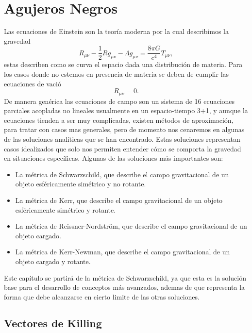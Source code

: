 \chapter{Agujeros Negros}

Las ecuaciones de Einstein son la teoría moderna por la cual describimos la gravedad 
\begin{equation}
    R_{\mu \nu}-\frac{1}{2} R g_{\mu \nu}-\Lambda g_{\mu \nu} = \frac{8 \pi G}{c^4} T_{\mu \nu},
    \label{EinsteinFieldEquations}
\end{equation}
estas describen como se curva el espacio dada una distribución de materia. Para los casos donde no estemos en presencia de materia se deben de cumplir las ecuaciones de vació
\begin{equation}
    R_{\mu \nu} = 0.
    \label{vacuumFieldEquations}
\end{equation}
De manera genérica las ecuaciones de campo son un sistema de 16 ecuaciones parciales acopladas no lineales usualmente en un espacio-tiempo 3+1,  y aunque la ecuaciones tienden a ser muy complicadas, existen métodos de aproximación, para tratar con casos mas generales, pero de momento nos cenaremos en algunas de las  soluciones analíticas que se han encontrado. Estas soluciones representan casos idealizados que solo  nos permiten entender cómo se comporta la gravedad en situaciones específicas. Algunas de las soluciones más importantes son:

\begin{itemize}
    \item La métrica de Schwarzschild, que describe el campo gravitacional de un objeto esféricamente simétrico y no rotante.
    \item La métrica de Kerr, que describe el campo gravitacional de un objeto esféricamente simétrico y rotante.
    \item La métrica de Reissner-Nordström, que describe el campo gravitacional de un objeto cargado.
    \item La métrica de Kerr-Newman, que describe el campo gravitacional de un objeto cargado y rotante.
\end{itemize}
Este capítulo se partirá de la métrica de Schwarzschild, ya que esta es la solución base para el desarrollo de conceptos más avanzados, ademas de que representa la forma que debe alcanzarse en cierto limite de las otras soluciones.

\section{Vectores de Killing}
\label{sec:vectoresKilling}


